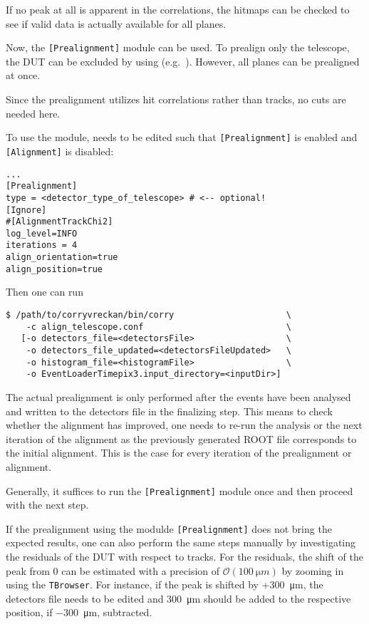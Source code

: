 If no peak at all is apparent in the correlations, the hitmaps can be checked to see if valid data is actually available for all planes.

Now, the \texttt{[Prealignment]} module can be used.
To prealign only the telescope, the DUT can be excluded by using  (e.g.~).
However, all planes can be prealigned at once.

Since the prealignment utilizes hit correlations rather than tracks, no cuts are needed here.

To use the module,  needs to be edited such that \texttt{[Prealignment]} is enabled and \texttt{[Alignment]} is disabled:
\begin{verbatim}
...
[Prealignment]
type = <detector_type_of_telescope> # <-- optional!
[Ignore]
#[AlignmentTrackChi2]
log_level=INFO
iterations = 4
align_orientation=true
align_position=true
\end{verbatim}

Then one can run
\begin{verbatim}
$ /path/to/corryvreckan/bin/corry                      \
    -c align_telescope.conf                            \
   [-o detectors_file=<detectorsFile>                  \
    -o detectors_file_updated=<detectorsFileUpdated>   \
    -o histogram_file=<histogramFile>                  \
    -o EventLoaderTimepix3.input_directory=<inputDir>]
\end{verbatim}

The actual prealignment is only performed after the events have been analysed and written to the detectors file in the finalizing step. 
This means to check whether the alignment has improved, one needs to re-run the analysis or the next iteration of the alignment as the previously generated ROOT file corresponds to the initial alignment.
This is the case for every iteration of the prealignment or alignment.

Generally, it suffices to run the \texttt{[Prealignment]} module once and then proceed with the next step.

If the prealignment using the modulde \texttt{[Prealignment]} does not bring the expected results, one can also perform the same steps manually by investigating the residuals of the DUT with respect to tracks.
For the residuals, the shift of the peak from 0 can be estimated with a precision of $\mathcal{O}(\SI{100}{\micro m})$ by zooming in using the \texttt{TBrowser}.
For instance, if the peak is shifted by +\SI{+300}{\micro m}, the detectors file needs to be edited and \SI{+300}{\micro m} should be added to the respective position, if \SI{-300}{\micro m}, subtracted.

